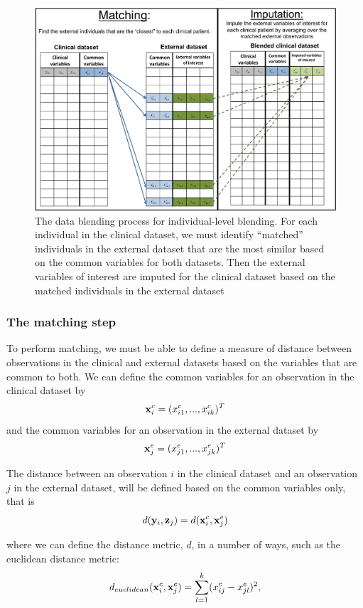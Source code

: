 \documentclass{article}
\begin{document}
\begin{figure}[H]
\begin{center}
\includegraphics[scale=0.45]{blending.png}
\end{center}
\caption{The data blending process for individual-level blending. For each individual in the clinical dataset, we must identify ``matched'' individuals in the external dataset that are the most similar based on the common variables for both datasets. Then the external variables of interest are imputed for the clinical dataset based on the matched individuals in the external dataset}
\label{fig:blend}
\end{figure}

\subsubsection{The matching step}

To perform matching, we must be able to define a measure of distance between observations in the clinical and external datasets based on the variables that are common to both. We can define the common variables for an observation in the clinical dataset by 
$${\bf x}_i^c = (x_{i1}^c, ..., x_{ik}^c)^T$$
and the common variables for an observation in the external dataset by
$${\bf x}_j^e = (x_{j1}^e, ..., x_{jk}^e)^T$$

The distance between an observation $i$ in the clinical dataset and an observation $j$ in the external dataset, will be defined based on the common variables only, that is
$$d({\bf y}_i, {\bf z}_j) = d({\bf x}_i^c, {\bf x}_j^e)$$

where we can define the distance metric, $d$, in a number of ways, such as the euclidean distance metric:
$$d_{euclidean}({\bf x}_i^c, {\bf x}_j^e) = \sum_{l=1}^k(x_{ij}^c - x_{jl}^e)^2,$$
\end{document}
